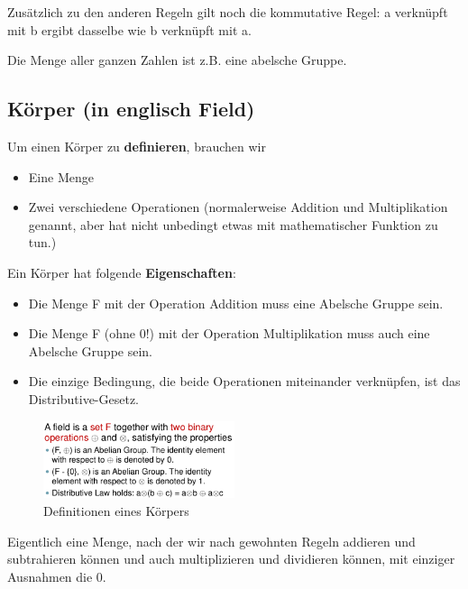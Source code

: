 Zusätzlich zu den anderen Regeln gilt noch die kommutative Regel: a verknüpft mit b ergibt dasselbe wie b verknüpft mit a.

\begin{tcolorbox}[colback=red!5!white,colframe=red!75!black]
    Die Menge aller ganzen Zahlen ist z.B. eine abelsche Gruppe.
\end{tcolorbox}

\hypertarget{kuxf6rper-in-englisch-field}{%
\subsection{Körper (in englisch
Field)}\label{kuxf6rper-in-englisch-field}}

Um einen Körper zu \textbf{definieren}, brauchen wir
\begin{itemize}
    \item Eine Menge
    \item Zwei verschiedene Operationen (normalerweise Addition und Multiplikation genannt, aber hat nicht unbedingt etwas mit mathematischer Funktion zu tun.)
\end{itemize}

Ein Körper hat folgende \textbf{Eigenschaften}:
\begin{itemize}
    \item Die Menge F mit der Operation Addition muss eine Abelsche Gruppe sein.
    \item Die Menge F (ohne 0!) mit der Operation Multiplikation muss auch eine Abelsche Gruppe sein.
    \item Die einzige Bedingung, die beide Operationen miteinander verknüpfen, ist das Distributive-Gesetz.
\end{itemize}

\begin{figure}[H]
\centering
\includegraphics[width=0.5\textwidth]{figures/field.png}
\caption{Definitionen eines Körpers}
\end{figure}

Eigentlich eine Menge, nach
der wir nach gewohnten Regeln addieren und subtrahieren können und auch
multiplizieren und dividieren können, mit einziger Ausnahmen die 0.

